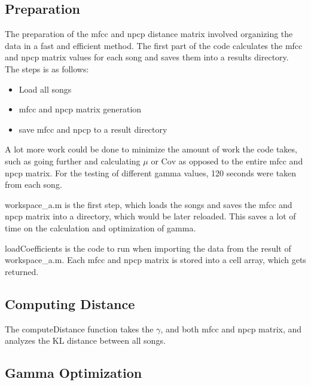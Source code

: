 \documentclass[11pt, a4paper]{article}
\begin{document}
\subsection{Preparation}

The preparation of the mfcc and npcp distance matrix involved organizing the data in a fast and efficient method. The first part of the code calculates the mfcc and npcp matrix values for each song and saves them into a results directory. \\

The steps is as follows:
\begin{itemize}
    \item Load all songs
    \item mfcc and npcp matrix generation
    \item save mfcc and npcp to a result directory
\end{itemize}

A lot more work could be done to minimize the amount of work the code takes, such as going further and calculating $\mu$ or $\mathrm{Cov}$ as opposed to the entire mfcc and npcp matrix. For the testing of different gamma values, 120 seconds were taken from each song. 





workspace\_a.m is the first step, which loads the songs and saves the mfcc and npcp matrix into a directory, which would be later reloaded. This saves a lot of time on the calculation and optimization of gamma. 



loadCoefficients is the code to run when importing the data from the result of workspace\_a.m. Each mfcc and npcp matrix is stored into a cell array, which gets returned.

\subsection{Computing Distance}



The computeDistance function takes the $\gamma$, and both mfcc and npcp matrix, and analyzes the KL distance between all songs.

\subsection{Gamma Optimization}
\end{document}
